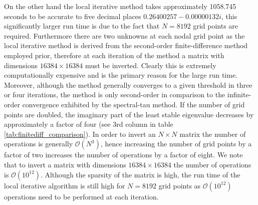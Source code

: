 \documentclass[a4paper, 12pt, twoside, openright]{article}
\numberwithin{equation}{section}
\begin{document}
On the other hand the local iterative method takes approximately 1058.745 seconds to be accurate to five decimal places $0.26400257 - 0.00000132i$, this significantly larger run time is due to the fact that $N=8192$ grid points are required. Furthermore there are two unknowns at each nodal grid point as the local iterative method is derived from the second-order finite-difference method employed prior, therefore at each iteration of the method a matrix with dimensions $16384\times16384$ must be inverted. Clearly this is extremely computationally expensive and is the primary reason for the large run time. Moreover, although the method generally converges to a given threshold in three or four iterations, the method is only second-order in comparison to the infinite-order convergence exhibited by the spectral-tau method. If the number of grid points are doubled, the imaginary part of the least stable eigenvalue decreases by approximately a factor of four (see 3rd column in table \ref{tab:finitediff_comparison}). In order to invert an $N\times N$ matrix the number of operations is generally $\mathcal{O}(N^3)$, hence increasing the number of grid points by a factor of two increases the number of operations by a factor of eight. We note that to invert a matrix with dimensions $16384\times16384$ the number of operations is $\mathcal{O}(10^{12})$. Although the sparsity of the matrix is high, the run time of the local iterative algorithm is still high for $N=8192$ grid points as $\mathcal{O}(10^{12})$ operations need to be performed at each iteration. %
\end{document}
